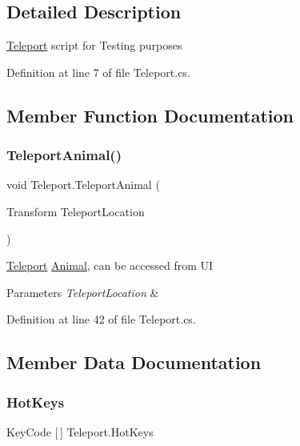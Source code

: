 \subsection{Detailed Description}
\mbox{\hyperlink{class_teleport}{Teleport}} script for Testing purposes 



Definition at line 7 of file Teleport.\+cs.



\subsection{Member Function Documentation}
\mbox{\label{class_teleport_ae61fbbaee5a688ae7d68fd92f5a91081}} 
\subsubsection{\texorpdfstring{Teleport\+Animal()}{TeleportAnimal()}}
{\footnotesize\ttfamily void Teleport.\+Teleport\+Animal (\begin{DoxyParamCaption}\item[{Transform}]{Teleport\+Location }\end{DoxyParamCaption})}



\mbox{\hyperlink{class_teleport}{Teleport}} \mbox{\hyperlink{class_animal}{Animal}}, can be accessed from UI 


\begin{DoxyParams}{Parameters}
{\em Teleport\+Location} & \\
\hline
\end{DoxyParams}


Definition at line 42 of file Teleport.\+cs.



\subsection{Member Data Documentation}
\mbox{\label{class_teleport_a6e17daf152d465ccbb1e7524f0d0ab57}} 
\subsubsection{\texorpdfstring{Hot\+Keys}{HotKeys}}
{\footnotesize\ttfamily Key\+Code \mbox{[}$\,$\mbox{]} Teleport.\+Hot\+Keys}



